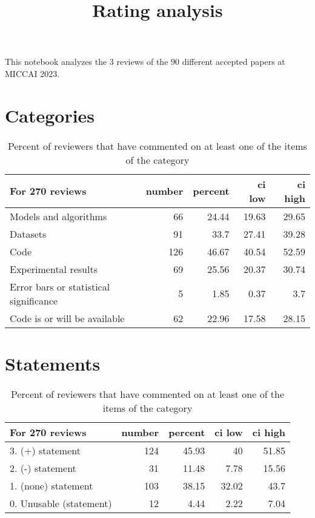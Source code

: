 \documentclass{article}
\title{Rating analysis}
\begin{document}
\maketitle

This notebook analyzes the 3 reviews of the 90 different accepted papers at MICCAI 2023.

\section{Categories} 

\begin{table}[H]

\centering

\begin{tabular}{lrrrr}
\hline
 For 270 reviews                        &   number &   percent &   ci low &   ci high \\
\hline
 Models and algorithms                  &       66 &     24.44 &    19.63 &     29.65 \\
 Datasets                               &       91 &     33.7  &    27.41 &     39.28 \\
 Code                                   &      126 &     46.67 &    40.54 &     52.59 \\
 Experimental results                   &       69 &     25.56 &    20.37 &     30.74 \\
 Error bars or statistical significance &        5 &      1.85 &     0.37 &      3.7  \\
 Code is or will be available           &       62 &     22.96 &    17.58 &     28.15 \\
\hline
\end{tabular}\caption{Percent of reviewers that have commented on at least one of the items of the category}

\end{table}



\section{Statements} 

\begin{table}[H]

\centering

\begin{tabular}{lrrrr}
\hline
 For 270 reviews         &   number &   percent &   ci low &   ci high \\
\hline
 3. (+) statement        &      124 &     45.93 &    40    &     51.85 \\
 2. (-) statement        &       31 &     11.48 &     7.78 &     15.56 \\
 1. (none) statement     &      103 &     38.15 &    32.02 &     43.7  \\
 0. Unusable (statement) &       12 &      4.44 &     2.22 &      7.04 \\
\hline
\end{tabular}\caption{Percent of reviewers that have commented on at least one of the items of the category}

\end{table}
\end{document}
